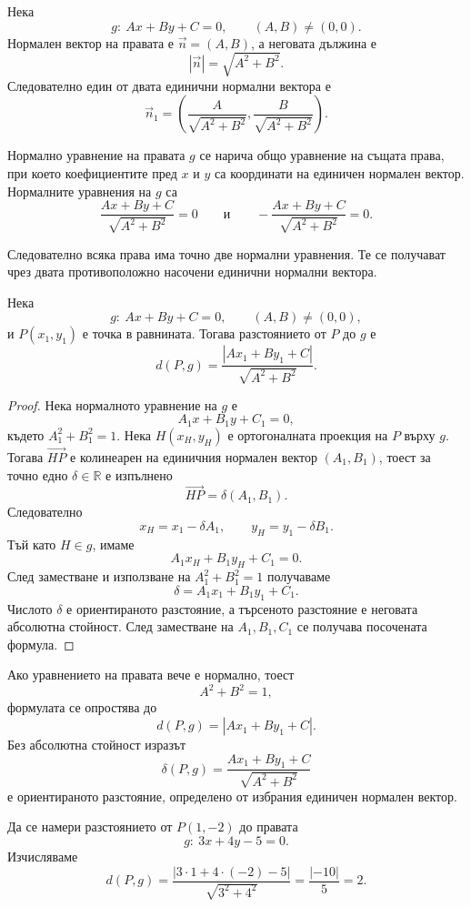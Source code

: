 Нека
\[
 g:\ Ax+By+C=0,\qquad (A,B)\neq(0,0).
\]
Нормален вектор на правата е $\vec n=(A,B)$, а неговата дължина е
\[
 |\vec n|=\sqrt{A^2+B^2}.
\]
Следователно един от двата единични нормални вектора е
\[
 \vec n_1=
 \left(
 \frac{A}{\sqrt{A^2+B^2}},
 \frac{B}{\sqrt{A^2+B^2}}
 \right).
\]

\begin{defn}
Нормално уравнение на правата $g$ се нарича общо уравнение на същата
права, при което коефициентите пред $x$ и $y$ са координати на единичен
нормален вектор. Нормалните уравнения на $g$ са
\[
 \frac{Ax+By+C}{\sqrt{A^2+B^2}}=0
 \qquad\text{и}\qquad
 -\frac{Ax+By+C}{\sqrt{A^2+B^2}}=0.
\]
\end{defn}

Следователно всяка права има точно две нормални уравнения. Те се
получават чрез двата противоположно насочени единични нормални вектора.

\begin{keythm}
Нека
\[
 g:\ Ax+By+C=0,\qquad (A,B)\neq(0,0),
\]
и $P(x_1,y_1)$ е точка в равнината. Тогава разстоянието от $P$ до $g$
е
\[
 d(P,g)=
 \frac{|Ax_1+By_1+C|}{\sqrt{A^2+B^2}}.
\]
\end{keythm}

\begin{proof}
Нека нормалното уравнение на $g$ е
\[
 A_1x+B_1y+C_1=0,
\]
където $A_1^2+B_1^2=1$. Нека $H(x_H,y_H)$ е ортогоналната проекция на
$P$ върху $g$. Тогава $\overrightarrow{HP}$ е колинеарен на единичния
нормален вектор $(A_1,B_1)$, тоест за точно едно $\delta\in\mathbb R$
е изпълнено
\[
 \overrightarrow{HP}=\delta(A_1,B_1).
\]
Следователно
\[
 x_H=x_1-\delta A_1,\qquad
 y_H=y_1-\delta B_1.
\]
Тъй като $H\in g$, имаме
\[
 A_1x_H+B_1y_H+C_1=0.
\]
След заместване и използване на $A_1^2+B_1^2=1$ получаваме
\[
 \delta=A_1x_1+B_1y_1+C_1.
\]
Числото $\delta$ е ориентираното разстояние, а търсеното разстояние е
неговата абсолютна стойност. След заместване на $A_1,B_1,C_1$ се
получава посочената формула.
\end{proof}

\begin{remark}
Ако уравнението на правата вече е нормално, тоест
\[
 A^2+B^2=1,
\]
формулата се опростява до
\[
 d(P,g)=|Ax_1+By_1+C|.
\]
Без абсолютна стойност изразът
\[
 \delta(P,g)=\frac{Ax_1+By_1+C}{\sqrt{A^2+B^2}}
\]
е ориентираното разстояние, определено от избрания единичен нормален
вектор.
\end{remark}

\begin{example}
Да се намери разстоянието от $P(1,-2)$ до правата
\[
 g:\ 3x+4y-5=0.
\]
Изчисляваме
\[
 d(P,g)=
 \frac{|3\cdot1+4\cdot(-2)-5|}{\sqrt{3^2+4^2}}
 =\frac{|-10|}{5}=2.
\]
\end{example}

